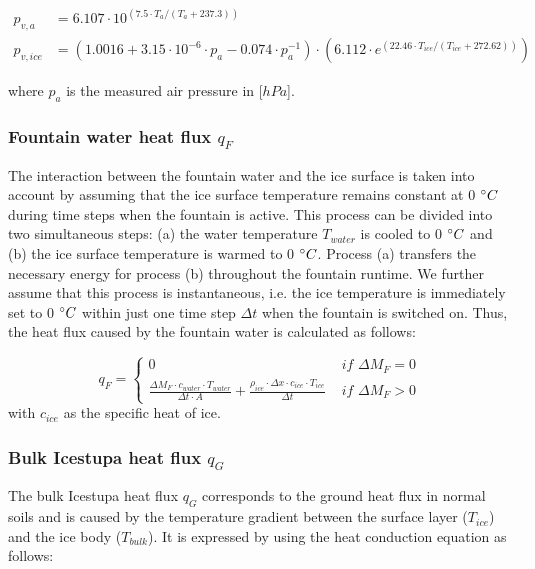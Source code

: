 \documentclass[utf8]{frontiersSCNS} %
\begin{document}
\begin{equation} \begin{split} p_{v,a}&=6.107 \cdot 10^{(7.5 \cdot T_a / (T_a + 237.3))}\\ p_{v,ice}&=(1.0016 +
3.15\cdot10^{-6}\cdot p_{a}-0.074\cdot p_{a}^{-1})\cdot(6.112 \cdot e^{(22.46 \cdot T_{ice} / (T_{ice} + 272.62))})
\end{split} \label{eqn:vp} \end{equation}

where $p_{a}$ is the measured air pressure in [$hPa$].  

\subsubsection{Fountain water heat flux
\texorpdfstring{$q_{F}$}{Lg} }

The interaction between the fountain water and the ice surface is taken into account by assuming that the ice surface
temperature remains constant at 0 $\degree C$ during time steps when the fountain is active. This process can be divided
into two simultaneous steps: (a) the water temperature $T_{water}$ is cooled to 0 $\degree C$ and (b) the ice surface
temperature is warmed to 0 $\degree C$.  Process (a) transfers the necessary energy for process (b) throughout the
fountain runtime. We further assume that this process is instantaneous, i.e. the ice temperature is immediately set to 0
$\degree C$ within just one time step $\Delta t$ when the fountain is switched on. Thus, the heat flux caused by the
fountain water is calculated as follows:

\begin{equation} 
  q_{F} = \left\{ \begin{array}{ll}
         0 & \textit{ if } \Delta M_{F} = 0\\ \frac{ \Delta M_F \cdot c_{water} \cdot T_{water}}{\Delta t \cdot A} +
         \frac{\rho_{ice} \cdot \Delta x \cdot c_{ice} \cdot T_{ice}}{\Delta t} & \textit{ if } \Delta M_{F} > 0 
    \end{array} \right.  \label{eqn:qF}
\end{equation} 
with $c_{ice}$ as the specific heat of ice. 

\subsubsection{Bulk Icestupa heat flux \texorpdfstring{$q_{G}$}{Lg}} \label{sec:Bulkflux}
The bulk Icestupa heat flux $q_{G}$ corresponds to the ground heat flux in normal soils and is caused by the temperature
gradient between the surface layer ($T_{ice}$) and the ice body ($T_{bulk}$). It is expressed by using the heat
conduction equation as follows:
\end{document}
